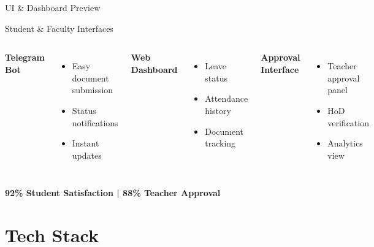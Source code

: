 \documentclass{beamer}
\begin{document}
\begin{frame}{UI \& Dashboard Preview}
\begin{block}{Student \& Faculty Interfaces}
\end{block}

\begin{columns}
\textbf{Telegram Bot}
\begin{itemize}
    \item Easy document submission
    \item Status notifications
    \item Instant updates
\end{itemize}

\textbf{Web Dashboard}
\begin{itemize}
    \item Leave status
    \item Attendance history
    \item Document tracking
\end{itemize}

\textbf{Approval Interface}
\begin{itemize}
    \item Teacher approval panel
    \item HoD verification
    \item Analytics view
\end{itemize}
\end{columns}

\vspace{0.5cm}
\begin{center}
\textbf{92\% Student Satisfaction | 88\% Teacher Approval}
\end{center}
\end{frame}

\section{Tech Stack}
\end{document}

